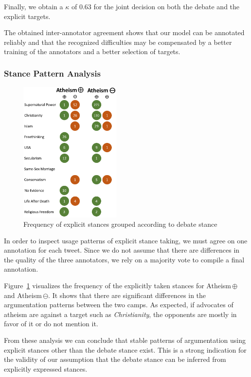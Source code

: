 \documentclass[11pt]{article}
\begin{document}
Finally, we obtain a $\kappa$ of 0.63 for the joint decision on both the debate and the explicit targets.

The obtained inter-annotator agreement shows that our model can be annotated reliably and that the recognized difficulties may be compensated by a better training of the annotators and a better selection of targets.
   
\subsubsection{Stance Pattern Analysis}

\begin{figure}[ht!]
\centering
  \includegraphics[width=0.45\textwidth]{figures/patterns_flat.png}
  \caption{Frequency of explicit stances grouped according to debate stance}
  \label{fig:patterns_flat}
\end{figure}

In order to inspect usage patterns of explicit stance taking, we must agree on one annotation for each tweet.
Since we do not assume that there are differences in the quality of the three annotators, we rely on a majority vote to compile a final annotation. 

Figure~\ref{fig:patterns_flat} visualizes the frequency of the explicitly taken stances for Atheism\,$\oplus$ and Atheism\,$\ominus$.
It shows that there are significant differences in the argumentation patterns between the two camps.
As expected, if advocates of atheism are against a target such as \textit{Christianity}, the opponents are mostly in favor of it or do not mention it.

From these analysis we can conclude that stable patterns of argumentation using explicit stances other than the debate stance exist.
This is a strong indication for the validity of our assumption that the debate stance can be inferred from explicitly expressed stances.
\end{document}
